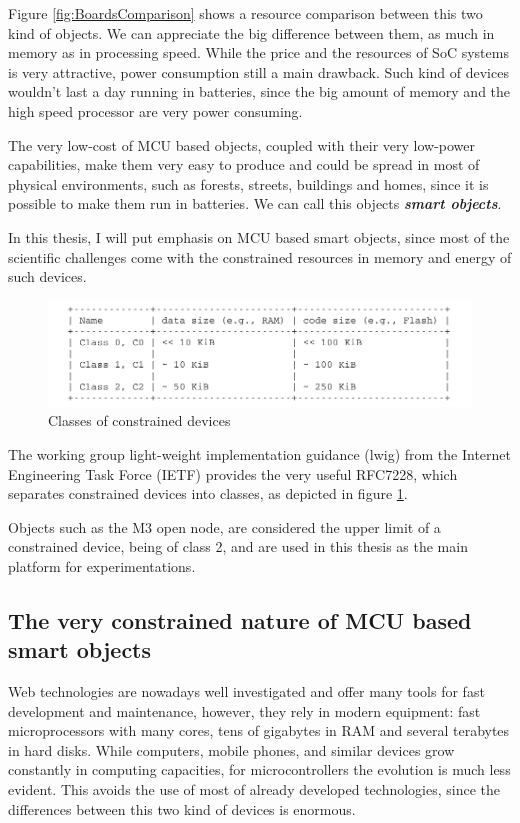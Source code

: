 Figure \ref{fig:BoardsComparison} shows a resource comparison between this two kind of objects.
We can appreciate the big difference between them, as much in memory as in processing speed.
While the price and the resources of SoC systems is very attractive, power consumption still a main drawback.
Such kind of devices wouldn't last a day running in batteries, since the big amount of memory and the high speed processor are very power consuming.

The very low-cost of MCU based objects, coupled with their very low-power capabilities, make them very easy to produce and could be spread in most of physical environments, such as forests, streets, buildings and homes, since it is possible to make them run in batteries.
We can call this objects \textit{\textbf{smart objects}}.

In this thesis, I will put emphasis on MCU based smart objects, since most of the scientific challenges come with the constrained resources in memory and energy of such devices.
\begin{figure}[htb]
	\centering
	\includegraphics[width=1\columnwidth]{chapters/background.images/DeviceClass.pdf}
	\caption{Classes of constrained devices}
	\label{fig:DeviceClass}
\end{figure}
The working group light-weight implementation guidance (lwig) from the Internet Engineering Task Force (IETF) provides the very useful RFC7228\cite{rfc7228}, which separates constrained devices into classes, as depicted in figure \ref{fig:DeviceClass}.

Objects such as the M3 open node, are considered the upper limit of a constrained device, being of class 2, and are used in this thesis as the main platform for experimentations.

\subsection{The very constrained nature of MCU based smart objects}
Web technologies are nowadays well investigated and offer many tools for fast development and maintenance, however, they rely in modern equipment: fast microprocessors with many cores, tens of gigabytes in RAM and several terabytes in hard disks.
While computers, mobile phones, and similar devices grow constantly in computing capacities, for microcontrollers the evolution is much less evident.
This avoids the use of most of already developed technologies, since the differences between this two kind of devices is enormous.

